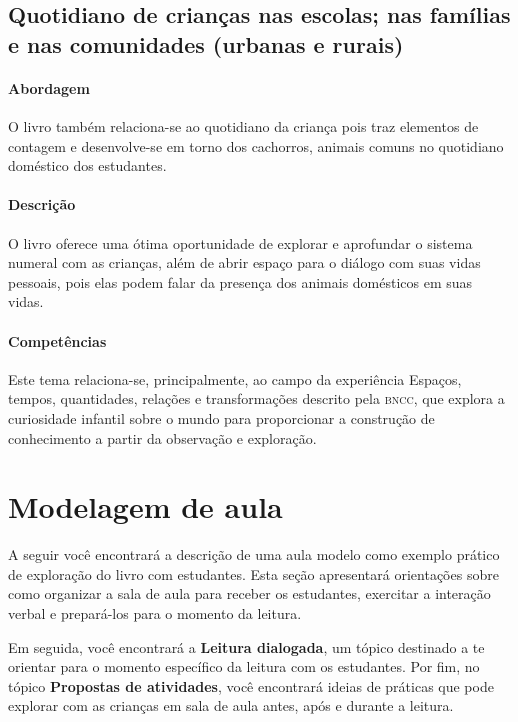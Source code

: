 \documentclass[11pt]{extarticle}
\begin{document}
\subsection{Quotidiano de crianças nas escolas; nas famílias e nas comunidades (urbanas e rurais)}

\paragraph{Abordagem} O livro também relaciona-se ao quotidiano da criança pois traz elementos de contagem e desenvolve-se em torno dos cachorros, animais comuns no quotidiano doméstico dos estudantes.

\paragraph{Descrição} O livro oferece uma ótima oportunidade de explorar 
e aprofundar o sistema numeral com as crianças, além de abrir espaço para o diálogo com suas vidas pessoais, pois elas podem falar da presença dos animais domésticos em suas vidas.

\paragraph{Competências} Este tema relaciona-se, principalmente, ao 
campo da experiência Espaços, tempos, quantidades, relações e transformações 
descrito pela \textsc{bncc}, que explora a curiosidade infantil sobre o mundo 
para proporcionar a construção de conhecimento a partir da observação e exploração.




\section{Modelagem de aula}
A seguir você encontrará a descrição de uma aula modelo como exemplo 
prático de exploração do livro com estudantes. Esta seção apresentará 
orientações sobre como organizar a sala de aula para receber os 
estudantes, exercitar a interação verbal e prepará-los para o 
momento da leitura.

Em seguida, você encontrará a \textbf{Leitura dialogada}, um 
tópico destinado a te orientar para o momento específico da 
leitura com os estudantes. Por fim, no tópico 
\textbf{Propostas de atividades}, você encontrará ideias 
de práticas que pode explorar com as crianças em sala de 
aula antes, após e durante a leitura. 
\end{document}
